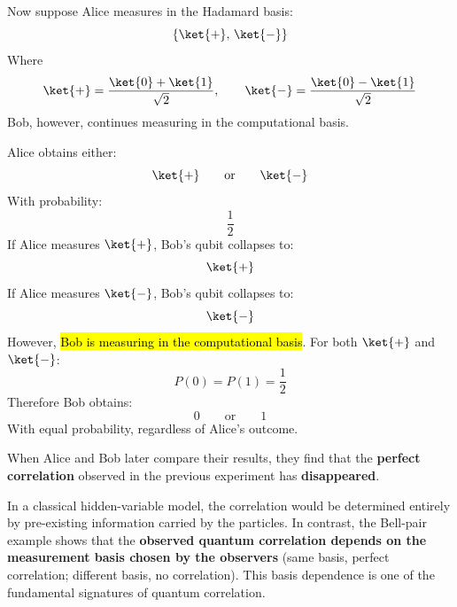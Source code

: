 \highspace
\begin{examplebox}
    Now suppose Alice measures in the Hadamard basis:
    \begin{equation*}
        \left\{
        \ket{+}, \, \ket{-}
        \right\}
    \end{equation*}
    Where
    \begin{equation*}
        \ket{+}
        =
        \frac{\ket{0}+\ket{1}}{\sqrt{2}},
        \qquad
        \ket{-}
        =
        \frac{\ket{0}-\ket{1}}{\sqrt{2}}
    \end{equation*}
    Bob, however, continues measuring in the computational basis.

    \highspace
    Alice obtains either:
    \begin{equation*}
        \ket{+}
        \qquad\text{or}\qquad
        \ket{-}
    \end{equation*}
    With probability:
    \begin{equation*}
        \frac{1}{2}
    \end{equation*}
    If Alice measures $\ket{+}$, Bob's qubit collapses to:
    \begin{equation*}
        \ket{+}
    \end{equation*}
    If Alice measures $\ket{-}$, Bob's qubit collapses to:
    \begin{equation*}
        \ket{-}
    \end{equation*}
    However, \hl{Bob is measuring in the computational basis}. For both $\ket{+}$ and $\ket{-}$:
    \begin{equation*}
        P(0)=P(1)=\frac{1}{2}
    \end{equation*}
    Therefore Bob obtains:
    \begin{equation*}
        0
        \qquad\text{or}\qquad
        1
    \end{equation*}
    With equal probability, regardless of Alice's outcome.

    \highspace
    When Alice and Bob later compare their results, they find that the \textbf{perfect correlation} observed in the previous experiment has \textbf{disappeared}.
\end{examplebox}

\highspace
\textcolor{Green3}{} In a classical hidden-variable model, the correlation would be determined entirely by pre-existing information carried by the particles. In contrast, the Bell-pair example shows that the \textbf{observed quantum correlation depends on the measurement basis chosen by the observers} (same basis, perfect correlation; different basis, no correlation). This basis dependence is one of the fundamental signatures of quantum correlation.